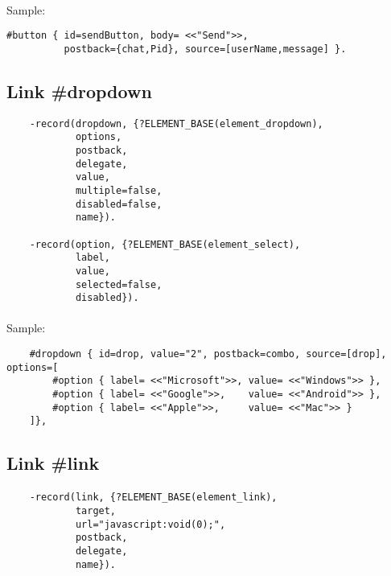 \paragraph{}
Sample:

\begin{lstlisting}
#button { id=sendButton, body= <<"Send">>,
          postback={chat,Pid}, source=[userName,message] }.
\end{lstlisting}

\subsection{Link {\bf \#dropdown}}

\vspace{1\baselineskip}
\begin{lstlisting}
    -record(dropdown, {?ELEMENT_BASE(element_dropdown),
            options,
            postback,
            delegate,
            value,
            multiple=false,
            disabled=false,
            name}).

    -record(option, {?ELEMENT_BASE(element_select),
            label,
            value,
            selected=false,
            disabled}).
\end{lstlisting}
\vspace{1\baselineskip}

\paragraph{}
Sample:

\begin{lstlisting}
    #dropdown { id=drop, value="2", postback=combo, source=[drop], options=[
        #option { label= <<"Microsoft">>, value= <<"Windows">> },
        #option { label= <<"Google">>,    value= <<"Android">> },
        #option { label= <<"Apple">>,     value= <<"Mac">> }
    ]},
\end{lstlisting}

\subsection{Link {\bf \#link}}

\paragraph{}
\vspace{1\baselineskip}
\begin{lstlisting}
    -record(link, {?ELEMENT_BASE(element_link),
            target,
            url="javascript:void(0);",
            postback,
            delegate,
            name}).
\end{lstlisting}
\vspace{1\baselineskip}

